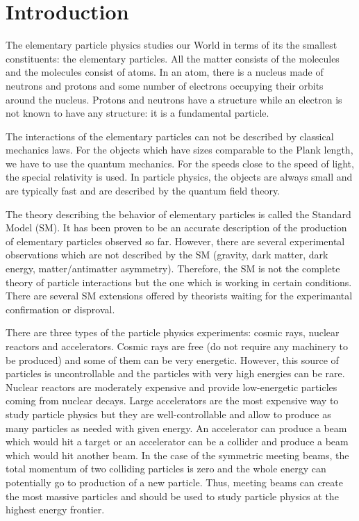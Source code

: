 \section{Introduction}
\label{sec:intro}

The elementary particle physics studies our World in terms of its the smallest constituents: the elementary particles. All the matter consists of the molecules and the molecules consist of atoms. In an atom, there is a nucleus made of neutrons and protons and some number of electrons occupying their orbits around the nucleus. Protons and neutrons have a structure while an electron is not known to have any structure: it is a fundamental particle.

The interactions of the elementary particles can not be described by classical mechanics laws. For the objects which have sizes comparable to the Plank length, we have to use the quantum mechanics. For the speeds close to the speed of light, the special relativity is used. In particle physics, the objects are always small and are typically fast and are described by the quantum field theory.

The theory describing the behavior of elementary particles is called the Standard Model (SM). It has been proven to be an accurate description of the production of elementary particles observed so far. However, there are several experimental observations which are not described by the SM (gravity, dark matter, dark energy, matter/antimatter asymmetry). Therefore, the SM is not the complete theory of particle interactions but the one which is working in certain conditions. There are several SM extensions offered by theorists waiting for the experimantal confirmation or disproval. 

There are three types of the particle physics experiments: cosmic rays, nuclear reactors and accelerators. Cosmic rays are free (do not require any machinery to be produced) and some of them can be very energetic. However, this source of particles is uncontrollable and the particles with very high energies can be rare. Nuclear reactors are moderately expensive and provide low-energetic particles coming from nuclear decays. Large accelerators are the most expensive way to study particle physics but they are well-controllable and allow to produce as many particles as needed with given energy. An accelerator can produce a beam which would hit a target or an accelerator can be a collider and produce a beam which would hit another beam. In the case of the symmetric meeting beams, the total momentum of two colliding particles is zero and the whole energy can potentially go to production of a new particle. Thus, meeting beams can create the most massive particles and should be used to study particle physics at the highest energy frontier.

